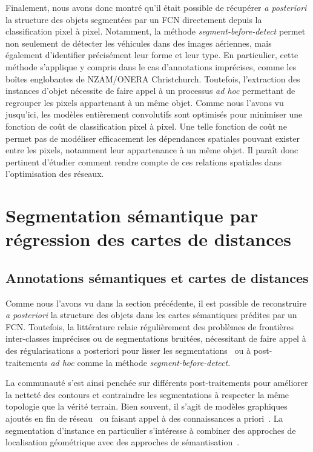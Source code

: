 Finalement, nous avons donc montré qu'il était possible de récupérer \emph{a posteriori} la structure des objets segmentées par un \gls{FCN} directement depuis la classification pixel à pixel. Notamment, la méthode \emph{segment-before-detect} permet non seulement de détecter les véhicules dans des images aériennes, mais également d'identifier précisément leur forme et leur type. En particulier, cette méthode s'applique y compris dans le cas d'annotations imprécises, comme les boîtes englobantes de NZAM/ONERA Christchurch.
Toutefois, l'extraction des instances d'objet nécessite de faire appel à un processus \emph{ad hoc} permettant de regrouper les pixels appartenant à un même objet. Comme nous l'avons vu jusqu'ici, les modèles entièrement convolutifs sont optimisés pour minimiser une fonction de coût de classification pixel à pixel. Une telle fonction de coût ne permet pas de modéliser efficacement les dépendances spatiales pouvant exister entre les pixels, notamment leur appartenance à un même objet. Il paraît donc pertinent d'étudier comment rendre compte de ces relations spatiales dans l'optimisation des réseaux.

\section{Segmentation sémantique par régression des cartes de distances}

\subsection{Annotations sémantiques et cartes de distances}

Comme nous l'avons vu dans la section précédente, il est possible de reconstruire \emph{a posteriori} la structure des objets dans les cartes sémantiques prédites par un \gls{FCN}. Toutefois, la littérature relaie régulièrement des problèmes de frontières inter-classes imprécises ou de segmentations bruitées, nécessitant de faire appel à des régularisations a posteriori pour lisser les segmentations~\cite{zheng_conditional_2015,l._c._chen_deeplab_2018} ou à post-traitements \emph{ad hoc} comme la méthode \emph{segment-before-detect}.

La communauté s'est ainsi penchée sur différents post-traitements pour améliorer la netteté des contours et contraindre les segmentations à respecter la même topologie que la vérité terrain. Bien souvent, il s'agit de modèles graphiques ajoutés en fin de réseau~\cite{z._liu_deep_2017} ou faisant appel à des connaissances a priori~\cite{le_reformulating_2017,bertasius_semantic_2016}. La segmentation d'instance en particulier s'intéresse à combiner des approches de localisation géométrique avec des approches de sémantisation~\cite{he_mask_2017,dai_instance-aware_2015}.

